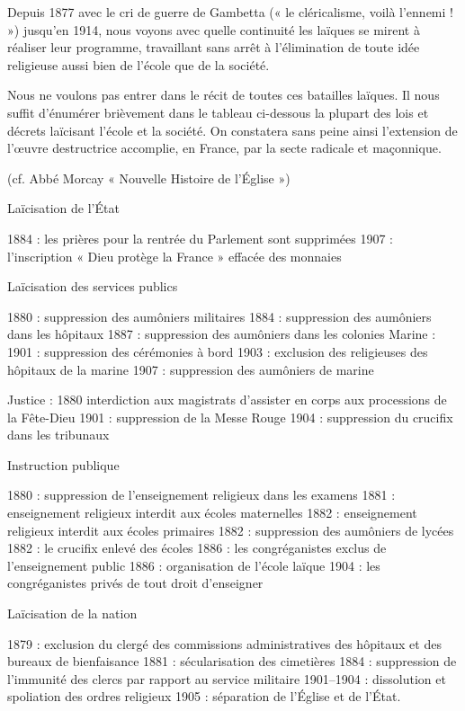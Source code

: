 Depuis 1877 avec le cri de guerre de Gambetta (« le cléricalisme, voilà l'ennemi ! ») jusqu'en 1914, nous voyons avec quelle continuité les laïques se mirent à réaliser leur programme, travaillant sans arrêt à l'élimination de toute idée religieuse aussi bien de l'école que de la société.

Nous ne voulons pas entrer dans le récit de toutes ces batailles laïques. Il nous suffit d'énumérer brièvement dans le tableau ci-dessous la plupart des lois et décrets laïcisant l'école et la société. On constatera sans peine ainsi l'extension de l'œuvre destructrice accomplie, en France, par la secte radicale et maçonnique.

(cf. Abbé Morcay « Nouvelle Histoire de l'Église »)

Laïcisation de l'État

1884 : les prières pour la rentrée du Parlement sont supprimées  
1907 : l'inscription « Dieu protège la France » effacée des monnaies

Laïcisation des services publics

1880 : suppression des aumôniers militaires  
1884 : suppression des aumôniers dans les hôpitaux  
1887 : suppression des aumôniers dans les colonies  
Marine : 1901 : suppression des cérémonies à bord  
1903 : exclusion des religieuses des hôpitaux de la marine  
1907 : suppression des aumôniers de marine

Justice : 1880 interdiction aux magistrats d'assister en corps aux processions de la Fête-Dieu  
1901 : suppression de la Messe Rouge  
1904 : suppression du crucifix dans les tribunaux

Instruction publique

1880 : suppression de l'enseignement religieux dans les examens  
1881 : enseignement religieux interdit aux écoles maternelles  
1882 : enseignement religieux interdit aux écoles primaires  
1882 : suppression des aumôniers de lycées  
1882 : le crucifix enlevé des écoles  
1886 : les congréganistes exclus de l'enseignement public  
1886 : organisation de l'école laïque  
1904 : les congréganistes privés de tout droit d'enseigner

Laïcisation de la nation

1879 : exclusion du clergé des commissions administratives des hôpitaux et des bureaux de bienfaisance  
1881 : sécularisation des cimetières  
1884 : suppression de l'immunité des clercs par rapport au service militaire  
1901--1904 : dissolution et spoliation des ordres religieux
1905 : séparation de l'Église et de l'État.

